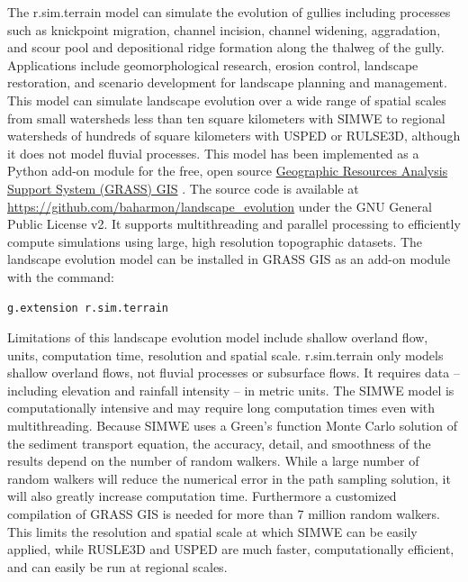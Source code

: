 \documentclass[gmd, manuscript]{copernicus}
\begin{document}
The r.sim.terrain model
can simulate the evolution of gullies
including processes such as 
knickpoint migration,
channel incision, 
channel widening, 
aggradation, and
scour pool and 
depositional ridge formation
along the thalweg of the gully. 
Applications include 
geomorphological research,
erosion control, 
landscape restoration, 
and scenario development 
for landscape planning and management.
This model can simulate landscape evolution 
over a wide range of spatial scales 
from small watersheds 
less than ten square kilometers
with SIMWE
to regional watersheds
of hundreds of square kilometers
with USPED or RULSE3D,
although it does not model fluvial processes. 
This model has been implemented 
as a Python add-on module 
for the free, open source
\href{https://grass.osgeo.org/}{Geographic Resources Analysis Support System (GRASS) GIS}
\citep{GRASS}. 
The source code is available at 
\url{https://github.com/baharmon/landscape\_evolution} 
under the GNU General Public License v2.
It supports multithreading and parallel processing
to efficiently compute simulations 
using large, high resolution topographic datasets.
%
The landscape evolution model 
can be installed in GRASS GIS as an add-on module 
with the command: 
\begin{verbatim}
g.extension r.sim.terrain
\end{verbatim}

Limitations of this landscape evolution model include
shallow overland flow, 
units, computation time, resolution and spatial scale.
r.sim.terrain only models shallow overland flows, 
not fluvial processes or subsurface flows. 
It requires data -- including 
elevation and rainfall intensity -- in metric units. 
The SIMWE model is computationally intensive 
and may require long computation times even with multithreading.
Because SIMWE uses a Green's function Monte Carlo solution 
of the sediment transport equation, 
the accuracy, detail, and smoothness of the results 
depend on the number of random walkers.
While a large number of random walkers will reduce the
numerical error in the path sampling solution,
it will also greatly increase computation time.
Furthermore a customized compilation of GRASS GIS 
is needed for more than 7 million random walkers.
This limits the resolution and spatial scale 
at which SIMWE can be easily applied,
while RUSLE3D and USPED are much faster, computationally efficient,
and can easily be run at regional scales. 
\end{document}
